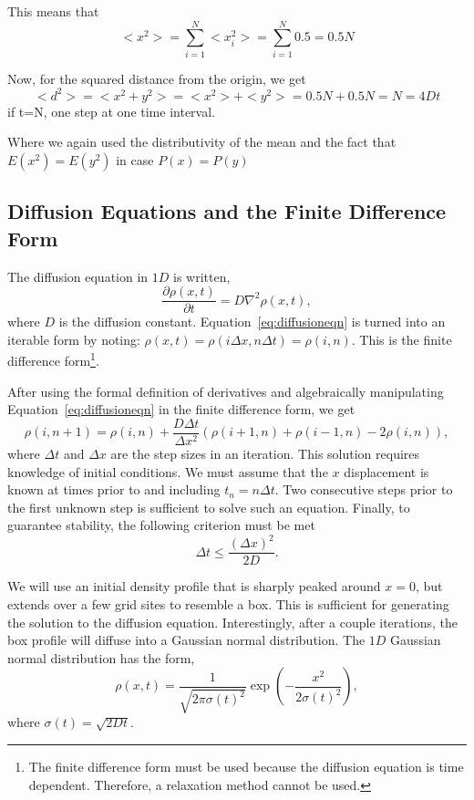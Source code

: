 \documentclass[12pt]{article}
\begin{document}
This means that
\begin{equation}
    <x^2>=\sum_{i=1}^N <x_i^2>=\sum_{i=1}^N 0.5=0.5N
\end{equation}

Now, for the squared distance from the origin, we get
\begin{equation}
    <d^2>=<x^2+y^2>=<x^2>+<y^2>=0.5N+0.5N=N=4Dt
\end{equation}
if t=N, one step at one time interval.

Where we again used the distributivity of the mean and the fact that $E(x^2)=E(y^2)$ in case $P(x)=P(y)$


\subsection{Diffusion Equations and the Finite Difference Form}
\label{sec:diffusionequation}
The diffusion equation in $1D$ is written,
\begin{equation}
  \label{eq:diffusioneqn}
  \frac{\partial\rho(x,t)}{\partial t} = D\nabla^2\rho(x,t),
\end{equation}
where $D$ is the diffusion constant. Equation~\ref{eq:diffusioneqn} is turned into an iterable form by noting: $\rho(x,t) = \rho(i\Delta x, n\Delta t) = \rho(i,n)$. This is the finite difference form\footnote{The finite difference form must be used because the diffusion equation is time dependent. Therefore, a relaxation method cannot be used.}.

After using the formal definition of derivatives and algebraically manipulating Equation~\ref{eq:diffusioneqn} in the finite difference form, we get
\begin{equation}
  \label{eq:diffusioneqn-iterable}
  \rho(i,n+1) = \rho(i,n) + \frac{D\Delta t}{\Delta x^2}\left(\rho(i+1,n) + \rho(i-1,n) - 2\rho(i,n)\right),
\end{equation}
where $\Delta t$ and $\Delta x$ are the step sizes in an iteration. This solution requires knowledge of initial conditions. We must assume that the $x$ displacement is known at times prior to and including $t_n = n\Delta t$. Two consecutive steps prior to the first unknown step is sufficient to solve such an equation. Finally, to guarantee stability, the following criterion must be met
\begin{equation}
  \label{eq:stabilitycriterion}
  \Delta t \leq \frac{(\Delta x)^2}{2D}.
\end{equation}

We will use an initial density profile that is sharply peaked around $x=0$, but extends over a few grid sites to resemble a box. This is sufficient for generating the solution to the diffusion equation. Interestingly, after a couple iterations, the box profile will diffuse into a Gaussian normal distribution. The $1D$ Gaussian normal distribution has the form,
\begin{equation}
  \label{eq:gaussiandistribution}
  \rho(x,t) = \frac{1}{\sqrt{2\pi\sigma(t)^2}}\exp\left(-\frac{x^2}{2\sigma(t)^2}\right),
\end{equation}
where $\sigma(t) = \sqrt{2Dt}$.
\end{document}
